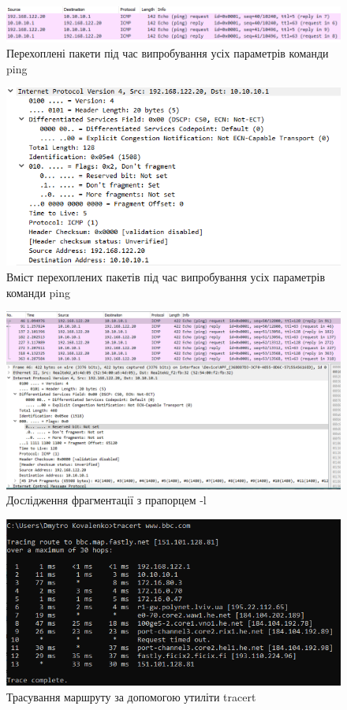 \documentclass{article}
\begin{document}
\begin{normalsize}
\begin{figure}[H]
	\centering
	\includegraphics[scale=0.55]{2}
	\caption{Перехоплені пакети під час випробування усіх параметрів команди ping}
\end{figure}

\begin{figure}[H]
	\centering
	\includegraphics[scale=0.8]{22}
	\caption{Вміст перехоплених пакетів під час випробування усіх параметрів команди ping}
\end{figure}

\begin{figure}[H]
	\centering
	\includegraphics[scale=0.45]{l}
	\caption{Дослідження фрагментації з прапорцем -l}
\end{figure}

\begin{figure}[H]
	\centering
	\includegraphics[scale=0.65]{t1}
	\caption{Трасування маршруту за допомогою утиліти tracert}
\end{figure}


\end{normalsize}
\end{document}
